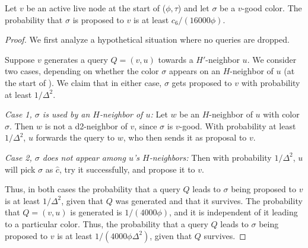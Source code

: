 \begin{lemma}
Let $v$ be an active live node at the start of ($\phi,\tau$) and let $\sigma$ be a $v$-good color. The probability that $\sigma$ is proposed to $v$ is at least $c_6/(16000\phi)$.
\label{L:sigma}
\end{lemma}
\begin{proof}
We first analyze a hypothetical situation where no queries are dropped.

Suppose $v$ generates a query $Q=(v,u)$ towards a $H'$-neighbor $u$.
%
We consider two cases, depending on whether the color $\sigma$ appears on an $H$-neighbor of $u$ (at the start of ). We claim that in either case, $\sigma$ gets proposed to $v$ with probability at least $1/\Delta^2$.

\textit{Case 1, $\sigma$ is used by an $H$-neighbor  of $u$: } Let $w$ be an $H$-neighbor of $u$ with color $\sigma$. Then $w$ is not a d2-neighbor of $v$, since $\sigma$ is $v$-good.
With probability at least $1/\Delta^2$, $u$ forwards the query to $w$, who then sends it as proposal to $v$.

\textit{Case 2, $\sigma$ does not appear among $u$'s $H$-neighbors:} Then with probability $1/\Delta^2$, $u$ will pick $\sigma$ as $\hat{c}$, try it successfully, and propose it to $v$.

Thus, in both cases the probability that a query $Q$ leads to $\sigma$ being proposed to $v$ is at least $1/\Delta^2$, given that $Q$ was generated and that it survives.
The probability that $Q=(v,u)$ is generated is $1/(4000\phi)$, and it is independent of it leading to a particular color.
Thus, the probability that a query $Q$ leads to $\sigma$ being proposed to $v$ is at least $1/(4000\phi\Delta^2)$, given that $Q$ survives. 



\end{proof}
